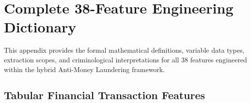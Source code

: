 \chapter{Complete 38-Feature Engineering Dictionary} \label{app:feature_dict}

This appendix provides the formal mathematical definitions, variable data types, extraction scopes, and criminological interpretations for all 38 features engineered within the hybrid Anti-Money Laundering framework.

\section{Tabular Financial Transaction Features}
\begingroup
\small
\setlength{\tabcolsep}{4pt}
